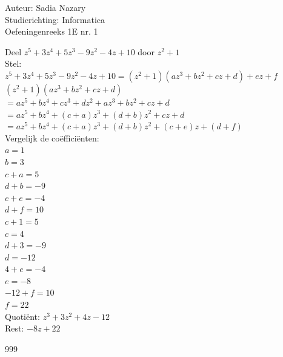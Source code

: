 \documentclass[a4paper]{article}
\begin{document}
  
\noindent \large Auteur: Sadia Nazary  \\
\noindent \large Studierichting: Informatica\\
\noindent \large Oefeningenreeks 1E nr. 1\\

\medskip

\normalsize

Deel $z^5 + 3z^4 + 5z^3 - 9z^2 - 4z + 10$ door $z^2 + 1$\\

Stel:\\

$z^5 + 3z^4 + 5z^3 - 9z^2 - 4z + 10 = (z^2 + 1)(az^3 + bz^2 + cz + d) + ez + f$\\

$(z^2 + 1)(az^3 + bz^2 + cz + d)$\\

$= az^5 + bz^4 + cz^3 + dz^2 + az^3 + bz^2 + cz + d$\\

$= az^5 + bz^4 + (c+a)z^3 + (d+b)z^2 + cz + d$\\

$= az^5 + bz^4 + (c+a)z^3 + (d+b)z^2 + (c+e)z + (d+f)$\\

Vergelijk de coëfficiënten:\\

$a = 1$\\

$b = 3$\\

$c + a = 5$\\

$d + b = -9$\\

$c + e = -4$\\

$d + f = 10$\\

$c + 1 = 5$\\

$c = 4$\\

$d + 3 = -9$\\

$d = -12$\\

$4 + e = -4$\\

$e = -8$\\

$-12 + f = 10$\\

$f = 22$\\

Quotiënt: $z^3 + 3z^2 + 4z - 12$\\

Rest: $-8z + 22$\\

\begin{thebibliography}{999}
\end{thebibliography}
\end{document}
